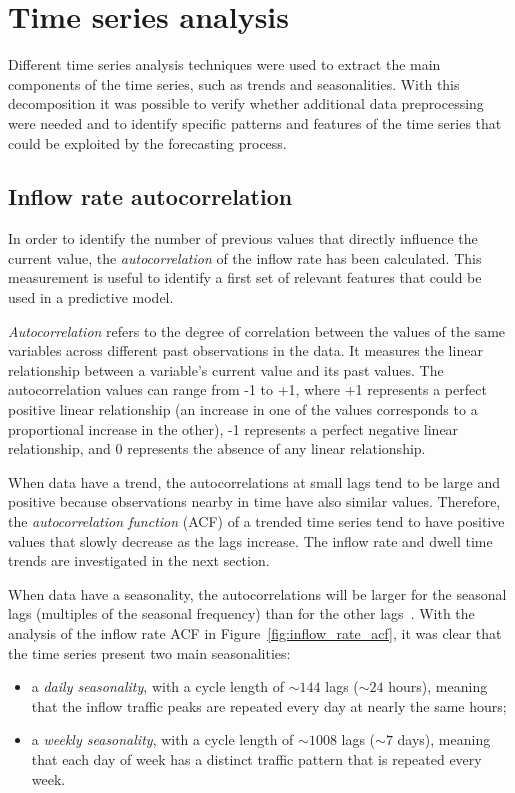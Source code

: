 \section{Time series analysis}
\label{sec:time_series_analysis}

Different time series analysis techniques were used to extract the main components of the time series, such as trends and seasonalities. With this decomposition it was possible to verify whether additional data preprocessing were needed and to identify specific patterns and features of the time series that could be exploited by the forecasting process.

\subsection{Inflow rate autocorrelation}
\label{subsec:inflow_rate_autocorrelation}

In order to identify the number of previous values that directly influence the current value, the \emph{autocorrelation} of the inflow rate has been calculated. This measurement is useful to identify a first set of relevant features that could be used in a predictive model.

\emph{Autocorrelation} refers to the degree of correlation between the values of the same variables across different past observations in the data. It measures the linear relationship between a variable's current value and its past values. The autocorrelation values can range from -1 to +1, where +1 represents a perfect positive linear relationship (an increase in one of the values corresponds to a proportional increase in the other), -1 represents a perfect negative linear relationship, and 0 represents the absence of any linear relationship.

When data have a trend, the autocorrelations at small lags tend to be large and positive because observations nearby in time have also similar values. Therefore, the \emph{autocorrelation function} (ACF) of a trended time series tend to have positive values that slowly decrease as the lags increase. The inflow rate and dwell time trends are investigated in the next section.

When data have a seasonality, the autocorrelations will be larger for the seasonal lags (multiples of the seasonal frequency) than for the other lags~\cite{hyndman2018}. With the analysis of the inflow rate ACF in Figure~\ref{fig:inflow_rate_acf}, it was clear that the time series present two main seasonalities:
\begin{itemize}
  \item a \emph{daily seasonality}, with a cycle length of \( {\sim}144 \) lags (\( {\sim}24 \) hours), meaning that the inflow traffic peaks are repeated every day at nearly the same hours;
  \item a \emph{weekly seasonality}, with a cycle length of \( {\sim}1008 \) lags (\( {\sim}7 \) days), meaning that each day of week has a distinct traffic pattern that is repeated every week.
\end{itemize}

